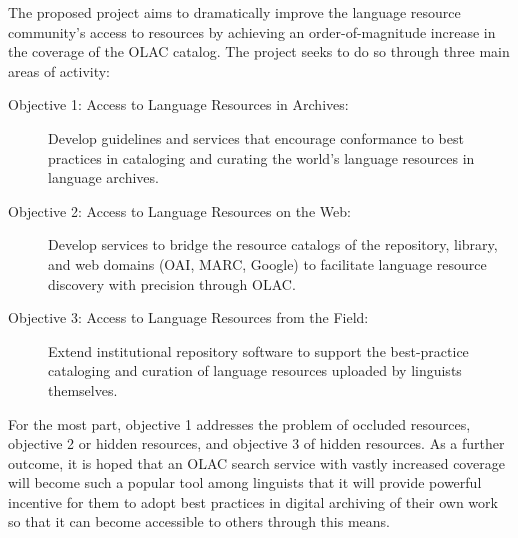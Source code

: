 
The proposed project aims to dramatically improve the language
resource community's access to resources by achieving an 
order-of-magnitude increase in the coverage of the OLAC catalog.
The project seeks to do so through three main areas of activity:

\begin{description}
  \item[Objective 1: Access to Language Resources in Archives:]
    Develop guidelines and services that encourage conformance to best
    practices in cataloging and curating the world's language resources
    in language archives.

  \item[Objective 2: Access to Language Resources on the Web:]
    Develop services to bridge the resource catalogs of the
    repository, library, and web domains (OAI, MARC, Google)
    to facilitate language resource discovery with precision through OLAC.

  \item[Objective 3: Access to Language Resources from the Field:]
    Extend institutional repository software to support the
    best-practice cataloging and curation of language resources
    uploaded by linguists themselves.
\end{description}

For the most part, objective 1 addresses the problem of occluded resources,
objective 2 or hidden resources, and objective 3 of hidden resources.
As a further outcome, it is hoped that an OLAC search
service with vastly increased coverage will become such a popular tool
among linguists that it will provide powerful incentive for them to
adopt best practices in digital archiving of their own work so that it
can become accessible to others through this means. 


